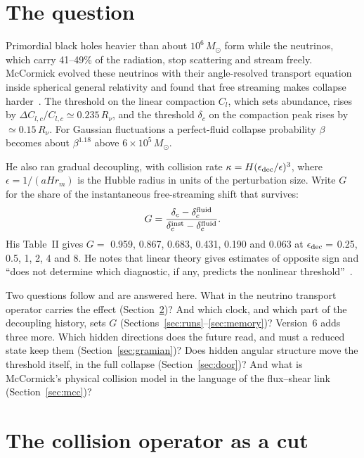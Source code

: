\documentclass[11pt]{article}
\begin{document}
\section{The question}

Primordial black holes heavier than about $10^6\,M_\odot$ form while the neutrinos, which carry 41--49\% of the radiation, stop scattering and stream freely. McCormick evolved these neutrinos with their angle-resolved transport equation inside spherical general relativity and found that free streaming makes collapse harder~\cite{McC}. The threshold on the linear compaction $C_l$, which sets abundance, rises by $\Delta C_{l,c}/C_{l,c}\simeq0.235\,R_\nu$, and the threshold $\delta_c$ on the compaction peak rises by $\simeq0.15\,R_\nu$. For Gaussian fluctuations a perfect-fluid collapse probability $\beta$ becomes about $\beta^{1.18}$ above $6\times10^5\,M_\odot$.

He also ran gradual decoupling, with collision rate $\kappa=H(\epsilon_{\rm dec}/\epsilon)^3$, where $\epsilon=1/(aHr_m)$ is the Hubble radius in units of the perturbation size. Write $G$ for the share of the instantaneous free-streaming shift that survives:
\begin{equation}
G=\frac{\delta_c-\delta_c^{\rm fluid}}{\delta_c^{\rm inst}-\delta_c^{\rm fluid}}.
\end{equation}
His Table~II gives $G=$ 0.959, 0.867, 0.683, 0.431, 0.190 and 0.063 at $\epsilon_{\rm dec}=$ 0.25, 0.5, 1, 2, 4 and 8. He notes that linear theory gives estimates of opposite sign and ``does not determine which diagnostic, if any, predicts the nonlinear threshold''~\cite[Sec.~IV\,C]{McC}.

Two questions follow and are answered here. What in the neutrino transport operator carries the effect (Section~\ref{sec:cut})? And which clock, and which part of the decoupling history, sets $G$ (Sections~\ref{sec:runs}--\ref{sec:memory})? Version~6 adds three more. Which hidden directions does the future read, and must a reduced state keep them (Section~\ref{sec:gramian})? Does hidden angular structure move the threshold itself, in the full collapse (Section~\ref{sec:door})? And what is McCormick's physical collision model in the language of the flux--shear link (Section~\ref{sec:mcc})?

\section{The collision operator as a cut}\label{sec:cut}
\end{document}
